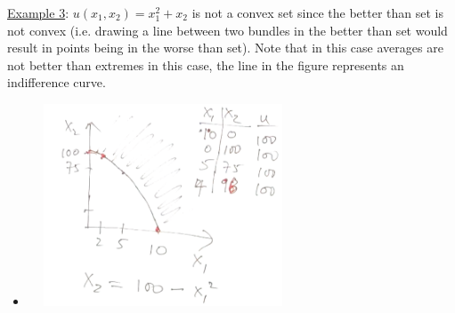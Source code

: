 \documentclass{article}
\begin{document}
  \par
  \underline{Example 3}: $u(x_{1},x_{2}) = x_{1}^{2} + x_{2}$ is not a convex set since the better than set is not convex (i.e. drawing a line between two bundles in the better than set would result in points being in the worse than set). Note that in this case averages are not better than extremes in this case, the line in the figure represents an indifference curve. 
  \begin{itemize}
    \item  \includegraphics[width=8cm, height=6cm]{pic18}
  \end{itemize}
\vspace{6mm}
\end{document}
